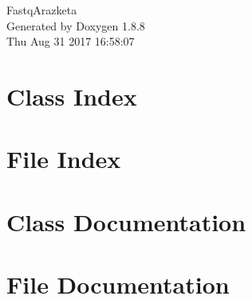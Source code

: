 \documentclass[twoside]{book}
\newcommand{\+}{\discretionary{\mbox{\scriptsize$\hookleftarrow$}}{}{}}
\newcommand{\clearemptydoublepage}{%
  \newpage{\pagestyle{empty}\cleardoublepage}%
}
\begin{document}
\hypersetup{pageanchor=false,
             bookmarks=true,
             bookmarksnumbered=true,
             pdfencoding=unicode
            }
\begin{titlepage}
\vspace*{7cm}
\begin{center}%
{\Large Fastq\+Arazketa }\\
\vspace*{1cm}
{\large Generated by Doxygen 1.8.8}\\
\vspace*{0.5cm}
{\small Thu Aug 31 2017 16:58:07}\\
\end{center}
\end{titlepage}
\clearemptydoublepage
\tableofcontents
\clearemptydoublepage
{}
\hypersetup{pageanchor=true}

\chapter{Class Index}

\chapter{File Index}

\chapter{Class Documentation}













\chapter{File Documentation}



































\newpage
{}
{}
\printindex
\end{document}
